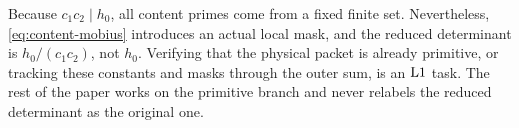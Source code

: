 \begin{remark}
\label{rem:content-literal-status}
Because \(c_1c_2\mid h_0\), all content primes come from a fixed
finite set.  Nevertheless, \eqref{eq:content-mobius} introduces an
actual local mask, and the reduced determinant is
\(h_0/(c_1c_2)\), not \(h_0\).  Verifying that the physical packet is
already primitive, or tracking these constants and masks through the
outer sum, is an \(\mathrm{L1}\) task.  The rest of the paper works on the
primitive branch and never relabels the reduced determinant as the
original one.
\end{remark}
